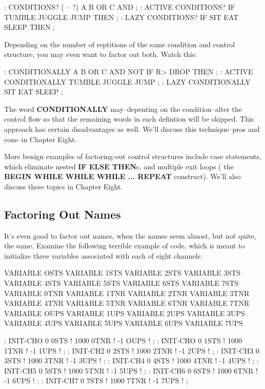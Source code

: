 \begin{Code}
: CONDITIONS? ( -- ?) A B OR C AND ;
: ACTIVE    CONDITIONS? IF TUMBLE JUGGLE JUMP THEN ;
: LAZY      CONDITIONS? IF    SIT  EAT  SLEEP THEN ;
\end{Code}

\noindent 
Depending on the number of reptitions of the same condition and control structure, you may even want to factor out both. Watch this:

\begin{Code}
: CONDITIONALLY   A B OR  C AND NOT IF  R> DROP   THEN ;
: ACTIVE   CONDITIONALLY   TUMBLE JUGGLE JUMP ;
: LAZY   CONDITIONALLY  SIT  EAT  SLEEP ;
\end{Code}

\noindent 
The word \textbf{CONDITIONALLY} may--depenting on the condition--alter the control flow so that the remaining words in each defintion will be skipped. This approach has certain disadvantages as well. We'll discuss this technique--pros and cons--in Chapter Eight.

More benign examples of factoring-out control structures include case statements, which eliminate nested \textbf{IF ELSE THEN}s, and multiple exit loops ( the \textbf{BEGIN WHILE WHILE WHILE ... REPEAT} construct). We'll also discuss these topics in Chapter Eight.

\subsection{{Factoring Out Names}}
It's even good to factor out names, when the names seem almost, but not quite, the same. Examine the following terrible example of code, which is meant to initialize three variables associated with each of eight channels:

\begin{Code}
VARIABLE OSTS       VARIABLE 1STS       VARIABLE 2STS 
VARIABLE 3STS       VARIABLE 4STS       VARIABLE 5STS
VARIABLE 6STS       VARIABLE 7STS       VARIABLE 0TNR
VARIABLE 1TNR       VARIABLE 2TNR       VARIABLE 3TNR
VARIABLE 4TNR       VARIABLE 5TNR       VARIABLE 6TNR
VARIABLE 7TNR       VARIABLE OUPS       VARIABLE 1UPS
VARIABLE 2UPS       VARIABLE 3UPS       VARIABLE 4UPS
VARIABLE 5UPS       VARIABLE 6UPS       VARIABLE 7UPS
\end{Code}

\begin{Code} 
: INIT-CHO   0 0STS !  1000 0TNR !  -1 OUPS ! ; 
: INIT-CHO   0 1STS !  1000 1TNR !  -1 1UPS ! ; 
: INIT-CH2   0 2STS !  1000 2TNR !  -1 2UPS ! ; 
: INIT-CH3   0 3STS !  1000 3TNR !  -1 3UPS ! ; 
: INIT-CH4   0 4STS !  1000 4TNR !  -1 4UPS ! ; 
: INIT-CH5   0 5STS !  1000 5TNR !  -1 5UPS ! ; 
: INIT-CH6   0 6STS !  1000 6TNR !  -1 6UPS ! ; 
: INIT-CH7   0 7STS !  1000 7TNR !  -1 7UPS ! ; 
\end{Code}

